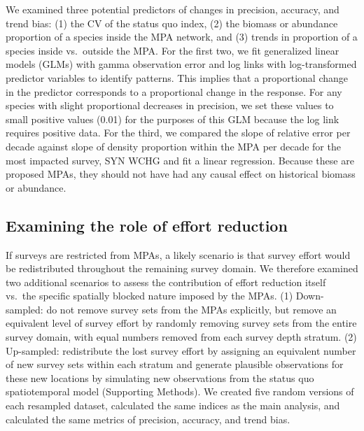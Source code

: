 \documentclass[12pt]{article}
\begin{document}
We examined three potential predictors of changes in precision, accuracy, and trend bias:
(1) the CV of the status quo index, (2) the biomass or abundance proportion of a species inside the MPA network, and (3) trends in proportion of a species inside vs.\ outside the MPA.
For the first two, we fit generalized linear models (GLMs) with gamma observation error and log links with log-transformed predictor variables to identify patterns.
This implies that a proportional change in the predictor corresponds to a proportional change in the response.
For any species with slight proportional decreases in precision, we set these values to small positive values (0.01) for the purposes of this GLM because the log link requires positive data.
For the third, we compared the slope of relative error per decade against slope of density proportion within the MPA per decade for the most impacted survey, SYN WCHG and fit a linear regression.
Because these are proposed MPAs, they should not have had any causal effect on historical biomass or abundance.

\subsection*{Examining the role of effort reduction}

If surveys are restricted from MPAs, a likely scenario is that survey effort would be redistributed throughout the remaining survey domain.
We therefore examined two additional scenarios to assess the contribution of effort reduction itself vs.\ the specific spatially blocked nature imposed by the MPAs.
(1) Down-sampled: do not remove survey sets from the MPAs explicitly, but remove an equivalent level of survey effort by randomly removing survey sets from the entire survey domain, with equal numbers removed from each survey depth stratum.
(2) Up-sampled: redistribute the lost survey effort by assigning an equivalent number of new survey sets within each stratum and generate plausible observations for these new locations by simulating new observations from the status quo spatiotemporal model (Supporting Methods).
We created five random versions of each resampled dataset, calculated the same indices as the main analysis, and calculated the same metrics of precision, accuracy, and trend bias.

\end{document}
